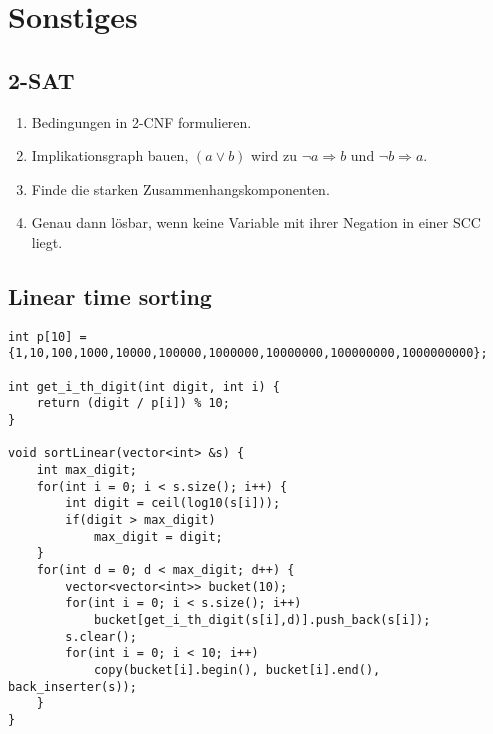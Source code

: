 \section{Sonstiges}

\subsection{2-SAT}
\begin{enumerate}
	\item Bedingungen in 2-CNF formulieren.
	\item Implikationsgraph bauen, $\left(a \vee b\right)$ wird zu $\neg a \Rightarrow b$ und $\neg b \Rightarrow a$.
	\item Finde die starken Zusammenhangskomponenten.
	\item Genau dann lösbar, wenn keine Variable mit ihrer Negation in einer SCC liegt.
\end{enumerate}

\subsection{Linear time sorting}

\begin{lstlisting}
int p[10] = {1,10,100,1000,10000,100000,1000000,10000000,100000000,1000000000};

int get_i_th_digit(int digit, int i) {
	return (digit / p[i]) % 10;
}

void sortLinear(vector<int> &s) {
	int max_digit;
	for(int i = 0; i < s.size(); i++) {
		int digit = ceil(log10(s[i]));
		if(digit > max_digit)
			max_digit = digit;
	}
	for(int d = 0; d < max_digit; d++) {
		vector<vector<int>> bucket(10);
		for(int i = 0; i < s.size(); i++)
			bucket[get_i_th_digit(s[i],d)].push_back(s[i]);
		s.clear();
		for(int i = 0; i < 10; i++)
			copy(bucket[i].begin(), bucket[i].end(), back_inserter(s));
	}
}
\end{lstlisting}
